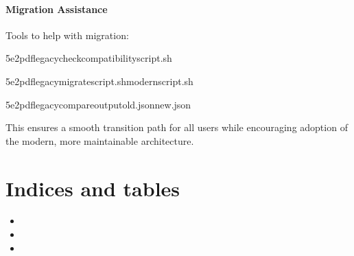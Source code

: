 \documentclass[letterpaper,10pt,english]{sphinxmanual}
\begin{document}
\subsubsection{Migration Assistance}
\label{\detokenize{developer/legacy:migration-assistance}}
\sphinxAtStartPar
Tools to help with migration:

\begin{sphinxVerbatim}[commandchars=\\\{\}]
5e2pdflegacy\PYGZhy{}\PYGZhy{}check\PYGZhy{}compatibilityscript.sh

5e2pdflegacy\PYGZhy{}\PYGZhy{}migratescript.sh\PYGZgt{}modern\PYGZhy{}script.sh

5e2pdflegacy\PYGZhy{}\PYGZhy{}compare\PYGZhy{}outputold.jsonnew.json
\end{sphinxVerbatim}

\sphinxAtStartPar
This ensures a smooth transition path for all users while encouraging adoption of the modern, more maintainable architecture.


\chapter{Indices and tables}
\label{\detokenize{index:indices-and-tables}}\begin{itemize}
\item {} 
\sphinxAtStartPar
{}

\item {} 
\sphinxAtStartPar
{}

\item {} 
\sphinxAtStartPar
{}

\end{itemize}
\end{document}
